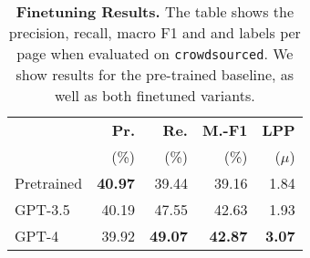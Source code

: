 \begin{table}[!ht]
\centering
\caption{\textbf{Finetuning Results.} The table shows the precision, recall, macro F1 and and labels per page when evaluated on \texttt{crowdsourced}. We show results for the pre-trained baseline, as well as both finetuned variants.}
\label{tab:finetune-results}
\begin{tabular}{lrrrr}
\toprule
 & \textbf{Pr.} & \textbf{Re.} & \textbf{M.-F1} & \textbf{LPP} \\
 & (\%) & (\%) & (\%) & ($\mu$) \\
\midrule
Pretrained & \textbf{40.97} & 39.44 & 39.16 & 1.84 \\
GPT-3.5 & 40.19 & 47.55 & 42.63 & 1.93 \\
GPT-4 & 39.92 & \textbf{49.07} & \textbf{42.87} & \textbf{3.07} \\
\bottomrule
\end{tabular}
\end{table}
